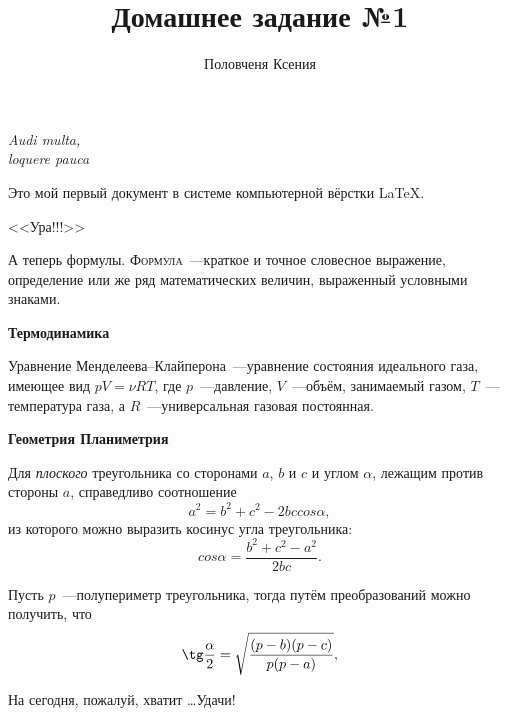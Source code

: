 \documentclass[12pt]{article}
\title{Домашнее задание №1}
\author{Половченя Ксения}
\date{}
\begin{document}
	\maketitle
	\begin{flushright}
	{\itshape Audi multa,\\ loquere pauca}
	\end{flushright}
	\hspace{20 pt}
	\begin{center}
	Это мой первый документ в системе компьютерной вёрстки \LaTeX.
	
	\hspace{20 pt}
	
	{\LARGE \sffamily <<Ура!!!>>}
	\hspace{15 pt}
	\end{center}
	\par
	
	А теперь формулы. {\scshape Формула}~---краткое и точное словесное выражение, определение или же ряд математических величин, выраженный условными знаками.
	\hspace{15 pt}
	
	\vspace{28 pt}
	
	{\Large \bfseries Термодинамика}
	
	Уравнение Менделеева--Клайперона~---уравнение состояния идеального газа, имеющее вид $pV = \nu RT$, где $p$~---давление,  $V$~---объём, занимаемый газом, $T$~---температура газа, а $R$~---универсальная газовая постоянная.
	
	\hspace{15 pt}
	
	\vspace{28 pt}
	{\Large \bfseries Геометрия \hfill Планиметрия}
	\par
	Для {\slshape плоского} треугольника со сторонами $a$, $b$ и $c$ и углом $\alpha$, лежащим против стороны $a$, справедливо соотношение $$a^2 = b^2 + c^2 - 2bccos\alpha,$$ из которого можно выразить косинус угла треугольника: $$cos\alpha = \frac{b^2+c^2-a^2}{2bc}.$$
	\par
	Пусть $p$~---полупериметр треугольника, тогда путём преобразований можно получить, что $$\tg\frac{\alpha}{2} = \sqrt{\frac{(p - b)(p - c)}{p(p - a)}},$$
	
	\vspace{1 cm}
	\begin{flushleft}
	На сегодня, пожалуй, хватит \ldots Удачи!
	\end{flushleft}
	
\end{document}
